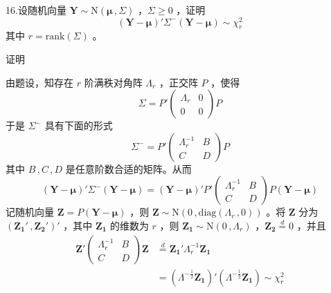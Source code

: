 \documentclass[12pt,hyperref,]{ctexart}
\begin{document}
\vspace{3em}

\kaishu

16.设随机向量
\(\boldsymbol{Y}\sim \mathrm{N}(\boldsymbol{\mu}\, ,\Sigma)\)
，\(\Sigma \ge 0\) ，证明 \begin{equation*}
(\boldsymbol{Y}-\boldsymbol{\mu})'\Sigma^{-}(\boldsymbol{Y}-\boldsymbol{\mu})\sim \chi_r^2
\end{equation*}其中 \(r=\mathrm{rank}(\Sigma)\) 。

\heiti

证明

\songti

由题设，知存在 \(r\) 阶满秩对角阵 \(\Lambda_r\) ，正交阵 \(P\) ，使得
\begin{equation*}
\Sigma=P'
\begin{pmatrix}
\Lambda_r & 0 \\
0 & 0
\end{pmatrix}P
\end{equation*}于是 \(\Sigma^-\) 具有下面的形式 \begin{equation*}
\Sigma^-=P'
\begin{pmatrix}
\Lambda_r^{-1} & B \\
C & D
\end{pmatrix}P
\end{equation*}其中 \(B\, ,C\, ,D\) 是任意阶数合适的矩阵。从而
\begin{equation*}
(\boldsymbol{Y}-\boldsymbol{\mu})'\Sigma^{-}(\boldsymbol{Y}-\boldsymbol{\mu})=(\boldsymbol{Y}-\boldsymbol{\mu})'P'
\begin{pmatrix}
\Lambda_r^{-1} & B \\
C & D
\end{pmatrix}P(\boldsymbol{Y}-\boldsymbol{\mu})
\end{equation*}记随机向量
\(\boldsymbol{Z}=P(\boldsymbol{Y}-\boldsymbol{\mu})\) ，则
\(\boldsymbol{Z}\sim \mathrm{N}\left(0\, ,\mathrm{diag}(\Lambda_r\, ,0)\right)\)
。将 \(\boldsymbol{Z}\) 分为
\((\boldsymbol{Z_1}'\, ,\boldsymbol{Z_2}')'\) ，其中
\(\boldsymbol{Z_1}\) 的维数为 \(r\) ，则
\(\boldsymbol{Z_1}\sim\mathrm{N}(0\, ,\Lambda_r)\)
，\(\boldsymbol{Z_2}\overset{d}{=}0\) ，并且 \begin{equation*}
\begin{aligned}
\boldsymbol{Z}'
\begin{pmatrix}
\Lambda_r^{-1} & B \\
C & D
\end{pmatrix}\boldsymbol{Z}&\overset{d}{=}\boldsymbol{Z_1}'\Lambda_r^{-1}\boldsymbol{Z_1}\\
&= \left(\Lambda^{-\frac 12}\boldsymbol{Z_1}\right)'\left(\Lambda^{-\frac 12}\boldsymbol{Z_1}\right)\sim\chi_r^2
\end{aligned}
\end{equation*}
\end{document}
